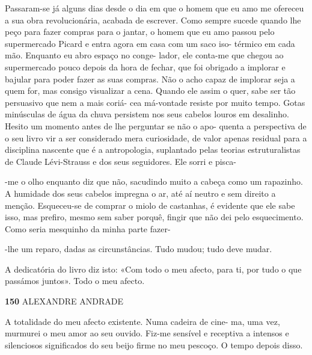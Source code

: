 Passaram-se já alguns dias desde o dia em que o homem que eu amo me
ofereceu a sua obra revolucionária, acabada de escrever. Como sempre
sucede quando lhe peço para fazer compras para o jantar, o homem que eu
amo passou pelo supermercado Picard e entra agora em casa com um saco
iso- térmico em cada mão. Enquanto eu abro espaço no conge- lador, ele
conta-me que chegou ao supermercado pouco depois da hora de fechar, que
foi obrigado a implorar e bajular para poder fazer as suas compras. Não
o acho capaz de implorar seja a quem for, mas consigo visualizar a cena.
Quando ele assim o quer, sabe ser tão persuasivo que nem a mais coriá-
cea má-vontade resiste por muito tempo. Gotas minúsculas de água da
chuva persistem nos seus cabelos louros em desalinho. Hesito um momento
antes de lhe perguntar se não o apo- quenta a perspectiva de o seu livro
vir a ser considerado mera curiosidade, de valor apenas residual para a
disciplina nascente que é a antropologia, suplantado pelas teorias
estruturalistas de Claude Lévi-Strauss e dos seus seguidores. Ele sorri
e pisca-

-me o olho enquanto diz que não, sacudindo muito a cabeça como um
rapazinho. A humidade dos seus cabelos impregna o ar, até aí neutro e
sem direito a menção. Esqueceu-se de comprar o miolo de castanhas, é
evidente que ele sabe isso, mas prefiro, mesmo sem saber porquê, fingir
que não dei pelo esquecimento. Como seria mesquinho da minha parte
fazer-

-lhe um reparo, dadas as circunstâncias. Tudo mudou; tudo deve mudar.

A dedicatória do livro diz isto: «Com todo o meu afecto, para ti, por
tudo o que passámos juntos». Todo o meu afecto.

\textbf{150 }ALEXANDRE ANDRADE

A totalidade do meu afecto existente. Numa cadeira de cine- ma, uma vez,
murmurei o meu amor ao seu ouvido. Fiz-me sensível e receptiva a
intensos e silenciosos significados do seu beijo firme no meu pescoço. O
tempo depois disso.

